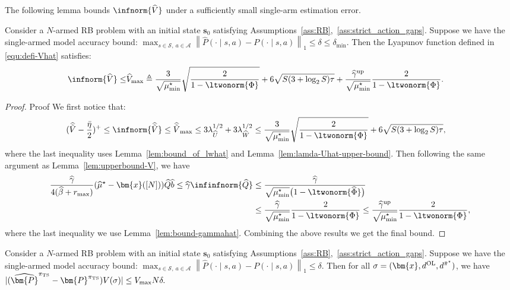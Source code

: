 \documentclass[mnsc,nonblindrev]{informs3}
\newcommand{\lwhhalf}{\lambda_{\widehat{W}}^{1/2}}
\newcommand{\ubgmhat}{\widehat{\gamma}^{\mathrm{up}}}
\newcommand{\Vhat}{\widehat{V}}
\newcommand{\bp}{\bm{P}}
\newcommand{\pibst}{\Bar{\pi}^\star}
\newcommand{\pits}{\pi_{\mathrm{TS}}}
\newcommand{\Qhat}{\widehat{Q}}
\newcommand{\bms}{\bm{s}}
\newcommand{\bmx}{\bm{x}}
\newcommand{\phihat}{\widehat{\Phi}}
\newcommand{\muhst}{\widehat{\mu}^\star}
\begin{document}
\begin{APPENDICES}
The following lemma bounds $\infnorm{\Vhat}$ under a sufficiently small single-arm estimation error.
\begin{lemma}\label{lem:vhat-upperbound}
   Consider a $N$-armed RB problem with an initial state $\bms_0$ satisfying Assumptions~\ref{ass:RB},~\ref{ass:strict_action_gaps}. Suppose we have the single-armed model accuracy bound:
    $
        \max_{s \in \mathcal{S},\ a \in \mathcal{A}} \left\| \widehat{P}(\cdot \mid s, a) - P(\cdot \mid s, a) \right\|_1 \le \delta\le\delta_{\min}.
    $
    Then the Lyapunov function defined in \eqref{equ:defi-Vhat} satisfies:
    \begin{align*}
        \infnorm{\widehat V}
        \le& \widehat{ V}_{\max}\triangleq\frac{3}{\sqrt{\mu^\star_{\min}}}\sqrt{\frac{2}{1-\ltwonorm{\Phi}}}+6\sqrt{S(3+\log_2S)\tau} 
         +\frac{\ubgmhat}{\sqrt{\mu^\star_{\min}}}\frac{2}{1-\ltwonorm{\Phi}}.
    \end{align*}
\end{lemma}

\begin{proof}{Proof}
    We first notice that:
    \begin{align*}
        (\widehat{\tilde V}-\frac{\bar\eta}{2})^+& \le \infnorm{\widehat{\tilde V}}\le \widehat{\tilde V}_{\max}\le 3\lambda_{\widehat{U}}^{1/2}+3\lwhhalf 
         \le\frac{3}{\sqrt{\mu^\star_{\min}}}\sqrt{\frac{2}{1-\ltwonorm{\Phi}}}+6\sqrt{S(3+\log_2S)\tau},
    \end{align*}
    where the last inequality uses Lemma~\ref{lem:bound_of_lwhat} and Lemma~\ref{lem:lamda-Uhat-upper-bound}.
    Then following the same argument as Lemma~\ref{lem:upperbound-V}, we have
    \begin{align*}
        \frac{\widehat\gamma}{4(\widehat \beta+r_{\max})}(\muhst-\bmx([N]))\Qhat \widehat b
        \le \widehat\gamma\infinfnorm{\widehat Q}
        & \le\frac{\widehat\gamma}{\sqrt{\mu^\star_{\min}}\big(1-\ltwonorm{\phihat}\big)}\\
        & \le\frac{\widehat\gamma}{\sqrt{\mu^\star_{\min}}}\frac{2}{1-\ltwonorm{\Phi}} 
          \le \frac{\ubgmhat}{\sqrt{\mu^\star_{\min}}}\frac{2}{1-\ltwonorm{\Phi}},
    \end{align*}
    where the last inequality we use Lemma~\ref{lem:bound-gammahat}. Combining the above results we get the final bound.
\end{proof}


\begin{lemma}\label{lem:phat-p-V}
Consider a $N$-armed RB problem with an initial state $\bms_0$ satisfying Assumptions~\ref{ass:RB},~\ref{ass:strict_action_gaps}. Suppose we have the single-armed model accuracy bound:
    $
        \max_{s \in \mathcal{S},\ a \in \mathcal{A}} \left\| \widehat{P}(\cdot \mid s, a) - P(\cdot \mid s, a) \right\|_1 \le \delta.
    $
    Then for all $\sigma=(\bmx,d^{\mathrm{OL}},d^{\pibst})$, we have
    $
        |(\widehat \bp^{\pits}-\bm{P}^{\pits} )V(\sigma)| \le V_{\max}N\delta.
    $
\end{lemma}


\end{APPENDICES}
\end{document}
